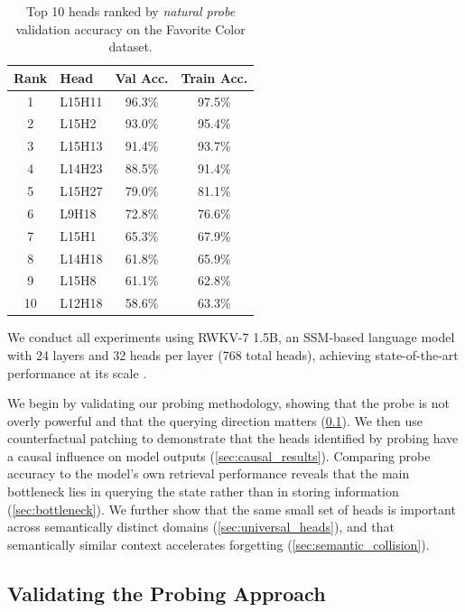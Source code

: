 \documentclass[11pt]{article}
\begin{document}
\begin{table}[t]
    \centering
    \small
    \caption{Top 10 heads ranked by \textit{natural probe} validation accuracy on the Favorite Color dataset.}
    \label{tab:top_heads}
    \begin{tabular}{@{}clcc@{}}
    \toprule
    Rank & Head & Val Acc. & Train Acc. \\
    \midrule
    1 & L15H11 & 96.3\% & 97.5\% \\
    2 & L15H2 & 93.0\% & 95.4\% \\
    3 & L15H13 & 91.4\% & 93.7\% \\
    4 & L14H23 & 88.5\% & 91.4\% \\
    5 & L15H27 & 79.0\% & 81.1\% \\
    6 & L9H18 & 72.8\% & 76.6\% \\
    7 & L15H1 & 65.3\% & 67.9\% \\
    8 & L14H18 & 61.8\% & 65.9\% \\
    9 & L15H8 & 61.1\% & 62.8\% \\
    10 & L12H18 & 58.6\% & 63.3\% \\
    \bottomrule
    \end{tabular}
    \end{table}

We conduct all experiments using RWKV-7 1.5B, an SSM-based language model with 24 layers and 32 heads per layer (768 total heads), achieving state-of-the-art performance at its scale \cite{peng2025rwkv7}.

We begin by validating our probing methodology, showing that the probe is not overly powerful and that the querying direction matters (\cref{sec:probing_ablation}). We then use counterfactual patching to demonstrate that the heads identified by probing have a causal influence on model outputs (\cref{sec:causal_results}). Comparing probe accuracy to the model's own retrieval performance reveals that the main bottleneck lies in querying the state rather than in storing information (\cref{sec:bottleneck}). We further show that the same small set of heads is important across semantically distinct domains (\cref{sec:universal_heads}), and that semantically similar context accelerates forgetting (\cref{sec:semantic_collision}).

\subsection{Validating the Probing Approach}
\label{sec:probing_ablation}
\end{document}
